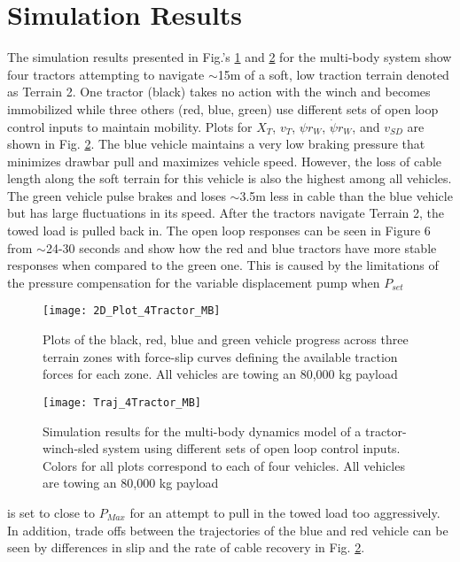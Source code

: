 \section{Simulation Results}
The simulation results presented in Fig.’s \ref{fig:2D_Plot_4Tractor_MB} and \ref{fig:Traj_4Tractor_MB} for the multi-body system show four tractors attempting to navigate $\sim$15m of a soft, low traction terrain denoted as Terrain 2. One tractor (black) takes no action with the winch and becomes immobilized while three others (red, blue, green) use different sets of open loop control inputs to maintain mobility. Plots for $X_T$, $v_T$, $\psi r_W$, $\dot\psi r_W$, and $v_{SD}$ are shown in Fig. \ref{fig:Traj_4Tractor_MB}. The blue vehicle maintains a very low braking pressure that minimizes drawbar pull and maximizes vehicle speed. However, the loss of cable length along the soft terrain for this vehicle is also the highest among all vehicles. The green vehicle pulse brakes and loses $\sim$3.5m less in cable than the blue vehicle but has large fluctuations in its speed. After the tractors navigate Terrain 2, the towed load is pulled back in. The open loop responses can be seen in Figure 6 from $\sim$24-30 seconds and show how the red and blue tractors have more stable responses when compared to the green one. This is caused by the limitations of the pressure compensation for the variable displacement pump when $P_{set}$
\begin{figure}[hb]
    \centering
    \texttt{[image: 2D\_Plot\_4Tractor\_MB]}
    \caption{Plots of the black, red, blue and green vehicle progress across three terrain zones with force-slip curves defining the available traction forces for each zone. All vehicles are towing an 80,000 kg payload}
    \label{fig:2D_Plot_4Tractor_MB}
\end{figure}
\begin{figure}[ht]
    \centering
    \texttt{[image: Traj\_4Tractor\_MB]}
    \caption{Simulation results for the multi-body dynamics model of a tractor-winch-sled system using different sets of open loop control inputs. Colors for all plots correspond to each of four vehicles. All vehicles are towing an 80,000 kg payload}
    \label{fig:Traj_4Tractor_MB}
\end{figure}
is set to close to $P_{Max}$ for an attempt to pull in the towed load too aggressively. In addition, trade offs between the trajectories of the blue and red vehicle can be seen by differences in slip and the rate of cable recovery in Fig. \ref{fig:Traj_4Tractor_MB}.


